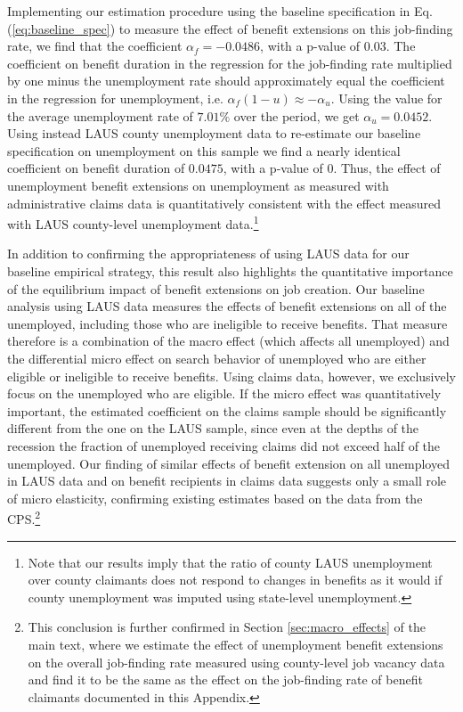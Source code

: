 \documentclass[12pt]{article}
\newcommand{\1}{\mathbf{1}}
\begin{document}
\begin{appendix}
Implementing our estimation procedure using the baseline specification in Eq. (\ref{eq:baseline_spec}) to measure the effect of benefit extensions on this job-finding rate, we find that the coefficient $\alpha_f=-0.0486$, with a p-value of $0.03$. The coefficient on benefit duration in the regression for the job-finding rate multiplied by one minus the unemployment rate should approximately equal the coefficient in the regression for unemployment, i.e. $\alpha_f(1-u)\approx -\alpha_u$.  Using the value for the average unemployment rate of $7.01\%$ over the period, we get $\alpha_u=0.0452$. Using instead LAUS county unemployment data to re-estimate our baseline specification on unemployment on this sample we find a nearly identical coefficient on benefit duration of $0.0475$, with a p-value of $0$. Thus, the effect of unemployment benefit extensions on unemployment as measured with administrative claims data is quantitatively consistent with the effect measured with LAUS county-level unemployment data.\footnote{Note that our results imply that the ratio of county LAUS unemployment over county claimants does not respond to changes in benefits as it would if county unemployment was imputed using state-level unemployment.}

In addition to confirming the appropriateness of using LAUS data for our baseline empirical strategy, this result also highlights the quantitative importance of the equilibrium impact of benefit extensions on job creation. Our baseline analysis using LAUS data measures the effects of benefit extensions on all of the unemployed, including those who are ineligible to receive benefits. That measure therefore is a combination of the macro effect (which affects all unemployed) and the differential micro effect on search behavior of unemployed who are either eligible or ineligible to receive benefits. Using claims data, however, we exclusively focus on the unemployed who are eligible. If the micro effect was quantitatively important, the estimated coefficient on the claims sample should be significantly different from the one on the LAUS sample, since even at the depths of the recession the fraction of unemployed receiving claims did not exceed half of the unemployed. Our finding of similar effects of benefit extension on all unemployed in LAUS data and on benefit recipients in claims data suggests only a small role of micro elasticity, confirming existing estimates based on the data from the CPS.\footnote{This conclusion is further confirmed in Section \ref{sec:macro_effects} of the main text, where we estimate the effect of unemployment benefit extensions on the overall job-finding rate measured using county-level job vacancy data and find it to be the same as the effect on the job-finding rate of benefit claimants documented in this Appendix.}




\end{appendix}
\end{document}
